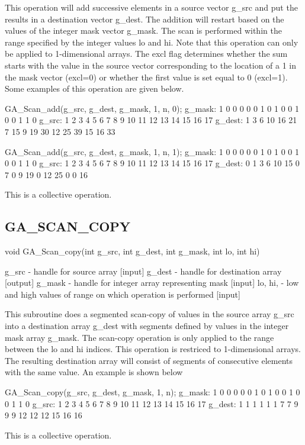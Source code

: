 This operation will add successive elements in a source vector g\_src
and put the results in a destination vector g\_dest. The addition
will restart based on the values of the integer mask vector g\_mask.
The scan is performed within the range specified by the integer values
lo and hi. Note that this operation can only be applied to 1-dimensional
arrays. The excl flag determines whether the sum starts with the value
in the source vector corresponding to the location of a 1 in the mask
vector (excl=0) or whether the first value is set equal to 0 (excl=1).
Some examples of this operation are given below.

GA\_Scan\_add(g\_src, g\_dest, g\_mask, 1, n, 0); g\_mask: 1 0 0 0
0 0 1 0 1 0 0 1 0 0 1 1 0 g\_src: 1 2 3 4 5 6 7 8 9 10 11 12 13 14
15 16 17 g\_dest: 1 3 6 10 16 21 7 15 9 19 30 12 25 39 15 16 33

GA\_Scan\_add(g\_src, g\_dest, g\_mask, 1, n, 1); g\_mask: 1 0 0 0
0 0 1 0 1 0 0 1 0 0 1 1 0 g\_src: 1 2 3 4 5 6 7 8 9 10 11 12 13 14
15 16 17 g\_dest: 0 1 3 6 10 15 0 7 0 9 19 0 12 25 0 0 16

This is a collective operation. 


\subsection*{GA\_SCAN\_COPY}

void GA\_Scan\_copy(int g\_src, int g\_dest, int g\_mask, int lo,
int hi)

g\_src - handle for source array {[}input{]} g\_dest - handle for
destination array {[}output{]} g\_mask - handle for integer array
representing mask {[}input{]} lo, hi, - low and high values of range
on which operation is performed {[}input{]}

This subroutine does a segmented scan-copy of values in the source
array g\_src into a destination array g\_dest with segments defined
by values in the integer mask array g\_mask. The scan-copy operation
is only applied to the range between the lo and hi indices. This operation
is restriced to 1-dimensional arrays. The resulting destination array
will consist of segments of consecutive elements with the same value.
An example is shown below

GA\_Scan\_copy(g\_src, g\_dest, g\_mask, 1, n); g\_mask: 1 0 0 0 0
0 1 0 1 0 0 1 0 0 1 1 0 g\_src: 1 2 3 4 5 6 7 8 9 10 11 12 13 14 15
16 17 g\_dest: 1 1 1 1 1 1 7 7 9 9 9 12 12 12 15 16 16

This is a collective operation. 



